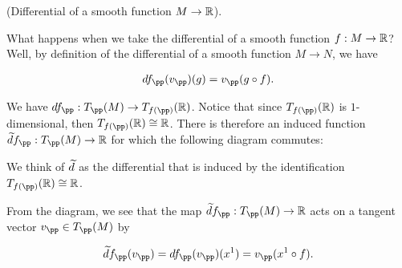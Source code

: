 \begin{theorem}
\label{ch::manifolds::thm::differential_smooth_map_M_R}
     (Differential of a smooth function $M \rightarrow \mathbb{R}$).
    
    What happens when we take the differential of a smooth function $f:M \rightarrow \mathbb{R}$? Well, by definition of the differential of a smooth function $M \rightarrow N$, we have
    
    \begin{align*}
        df_\pp(v_\pp)(g) = v_\pp(g \circ f).
    \end{align*}
    
    We have $df_\pp:T_\pp(M) \rightarrow T_{f(\pp)}(\R)$. Notice that since $T_{f(\pp)}(\R)$ is $1$-dimensional, then $T_{f(\pp)}(\R) \cong \R$. There is therefore an induced function $\td f_\pp:T_\pp(M) \rightarrow \R$ for which the following diagram commutes:
    
    \begin{center}
    \end{center}
    
    We think of $\widetilde{d}$ as the differential that is induced by the identification $T_{f(\pp)}(\R) \cong \R$.
    
    From the diagram, we see that the map $\td f_\pp:T_\pp(M) \rightarrow \R$ acts on a tangent vector $v_\pp \in T_\pp(M)$ by
    
    \begin{align*}
        \td f_\pp(v_\pp)
        = df_\pp (v_\pp)(x^1)
        = v_\pp(x^1 \circ f).
    \end{align*}
    

\end{theorem}
